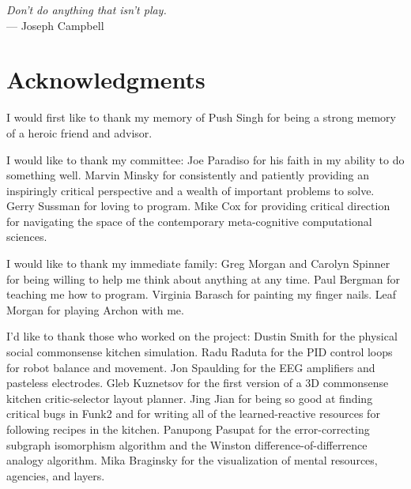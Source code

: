 



\begin{flushright}{\slshape    
Don't do anything that isn't play.} \\ \medskip
    --- Joseph Campbell
\end{flushright}



\bigskip

\begingroup
\let\clearpage\relax
\let\cleardoublepage\relax
\let\cleardoublepage\relax
\chapter*{Acknowledgments}

I would first like to thank my memory of Push Singh for being a strong
memory of a heroic friend and advisor.

\vspace{5mm}

\noindent I would like to thank my committee:
Joe Paradiso for his faith in my ability to do something well.
Marvin Minsky for consistently and patiently providing an inspiringly critical perspective and a wealth of important problems to solve.
Gerry Sussman for loving to program.
Mike Cox for providing critical direction for navigating the space of the contemporary meta-cognitive computational sciences.

\vspace{5mm}

\noindent I would like to thank my immediate family:
Greg Morgan and Carolyn Spinner for being willing to help me think about anything at any time.
Paul Bergman for teaching me how to program.
Virginia Barasch for painting my finger nails.
Leaf Morgan for playing Archon with me.

\vspace{5mm}

\noindent I'd like to thank those who worked on the project:
Dustin Smith for the physical social commonsense kitchen simulation.
Radu Raduta for the PID control loops for robot balance and movement.
Jon Spaulding for the EEG amplifiers and pasteless electrodes.
Gleb Kuznetsov for the first version of a 3D commonsense kitchen critic-selector layout planner.
Jing Jian for being so good at finding critical bugs in Funk2 and for writing all of the learned-reactive resources for following recipes in the kitchen.
Panupong Pasupat for the error-correcting subgraph isomorphism algorithm and the Winston difference-of-differrence analogy algorithm.
Mika Braginsky for the visualization of mental resources, agencies, and layers.


